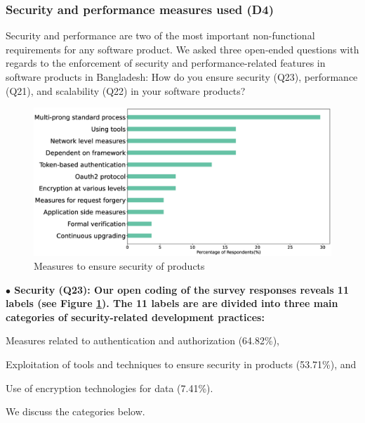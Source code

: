 \subsubsection{Security and performance measures used (D4)}
\label{security_performance}
Security and performance are two of the most important non-functional requirements for any software product. 
We asked three open-ended questions with regards to the enforcement of security and performance-related features in software products in Bangladesh:
How do you ensure security (Q23), performance (Q21), and scalability (Q22) in your software products?




\begin{figure}[h]
\centering
\includegraphics[scale=0.22]{Figures/Security.eps} 
\caption{Measures to ensure security of products}
\label{fig:Measures to ensure security}
\end{figure}
\nd\bf{$\bullet$ Security (Q23):} Our open coding of the survey responses reveals 11  
labels (see Figure \ref{fig:Measures to ensure security}). The 11 labels are are divided into three main categories of security-related development practices: 
\begin{inparaenum}
\item Measures related to authentication and authorization (64.82\%),
\item Exploitation of tools and techniques to ensure security in products (53.71\%), and 
\item Use of encryption technologies for data (7.41\%).
\end{inparaenum} We discuss the categories below.  



